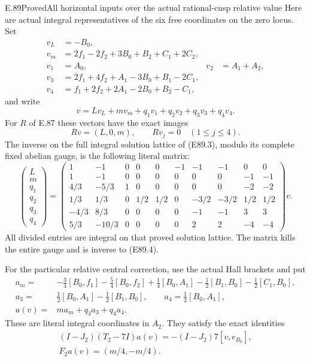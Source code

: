 \begin{statement}{E.89}{Proved}{All horizontal inputs over the actual rational-cusp relative value}
Here are actual integral representatives of the
six free coordinates on the zero locus. Set
\[
 \begin{aligned}
 v_L&=-B_0,\\
 v_m&=2f_1-2f_2+3B_0+B_2+C_1+2C_2,\\
 v_1&=A_0,&v_2&=A_1+A_2,\\
 v_3&=2f_1+4f_2+A_1-3B_0+B_1-2C_1,\\
 v_4&=f_1+2f_2+2A_1-2B_0+B_2-C_1,
 \end{aligned}
 \tag{E89.4}
\]
and write
\[
       v=L v_L+m v_m+q_1v_1+q_2v_2+q_3v_3+q_4v_4.
 \tag{E89.5}
\]
For $R$ of E.87 these vectors have the exact images
\[
 Rv=(L,0,m),\qquad
 Rv_j=0\quad(1\le j\le4).
 \tag{E89.6}
\]
The inverse on the full integral solution lattice
of (E89.3), modulo its complete fixed abelian
gauge, is the following literal matrix:
\[
 \begin{pmatrix}L\\m\\q_1\\q_2\\q_3\\q_4\end{pmatrix}
 =\begin{pmatrix}
 1&-1&0&0&0&-1&-1&-1&0&0\\
 1&-1&0&0&0&0&0&0&-1&-1\\
 4/3&-5/3&1&0&0&0&0&0&-2&-2\\
 1/3&1/3&0&1/2&1/2&0&-3/2&-3/2&1/2&1/2\\
 -4/3&8/3&0&0&0&0&-1&-1&3&3\\
 5/3&-10/3&0&0&0&0&2&2&-4&-4
 \end{pmatrix}v.
 \tag{E89.7}
\]
All divided entries are integral on that proved
solution lattice. The matrix kills the entire
gauge and is inverse to (E89.4).

For the particular relative central correction,
use the actual Hall brackets and put
\[
 \begin{aligned}
 a_m={}&-\tfrac34[B_0,f_1]-\tfrac54[B_0,f_2]
       +\tfrac14[B_0,A_1]
       -\tfrac12[B_1,B_0]-\tfrac12[C_1,B_0],\\
 a_3={}&\tfrac12[B_0,A_1]-\tfrac12[B_1,B_0],
       \qquad a_4=\tfrac12[B_0,A_1],\\
 a(v)={}&m a_m+q_3a_3+q_4a_4.
 \end{aligned}
 \tag{E89.8}
\]
These are literal integral coordinates in $A_2$.
They satisfy the exact identities
\[
 \begin{gathered}
 (I-J_2)(T_2-7I)a(v)
        =-(I-J_2)7[v,e_{B_0}],\\
 F_2a(v)=(m/4,-m/4).
 \end{gathered}
 \tag{E89.9}
\]


\end{statement}
